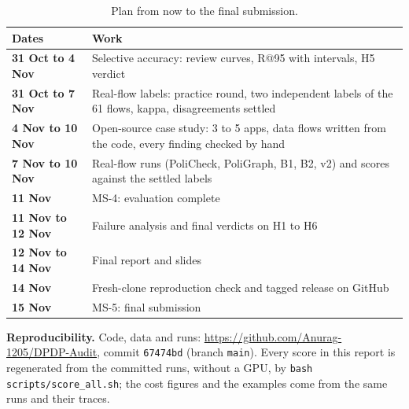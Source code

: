 \documentclass[11pt,a4paper]{article}
\newcommand{\rowline}{\specialrule{0.2pt}{3pt}{3pt}}
\begin{document}
\begin{table}[H]
\centering
\small
\begin{tabular}{lL{11cm}}
\toprule
Dates & Work \\
\midrule
\textbf{31 Oct to 4 Nov} & Selective accuracy: review curves, R@95 with intervals, H5
verdict \\ \rowline
\textbf{31 Oct to 7 Nov} & Real-flow labels: practice round, two independent labels of the 61
flows, kappa, disagreements settled \\ \rowline
\textbf{4 Nov to 10 Nov} & Open-source case study: 3 to 5 apps, data flows written from the code,
every finding checked by hand \\ \rowline
\textbf{7 Nov to 10 Nov} & Real-flow runs (PoliCheck, PoliGraph, B1, B2, v2) and scores against
the settled labels \\ \rowline
\textbf{11 Nov} & MS-4: evaluation complete \\ \rowline
\textbf{11 Nov to 12 Nov} & Failure analysis and final verdicts on H1 to H6 \\ \rowline
\textbf{12 Nov to 14 Nov} & Final report and slides \\ \rowline
\textbf{14 Nov} & Fresh-clone reproduction check and tagged release on GitHub \\ \rowline
\textbf{15 Nov} & MS-5: final submission \\
\bottomrule
\end{tabular}
\caption{Plan from now to the final submission.}
\end{table}

\textbf{Reproducibility.} Code, data and runs:
\url{https://github.com/Anurag-1205/DPDP-Audit}, commit \texttt{67474bd} (branch \texttt{main}).
Every score in this report is regenerated from the committed runs, without a GPU, by
\texttt{bash scripts/score\_all.sh}; the cost figures and the examples come from the same runs and
their traces.
\end{document}
